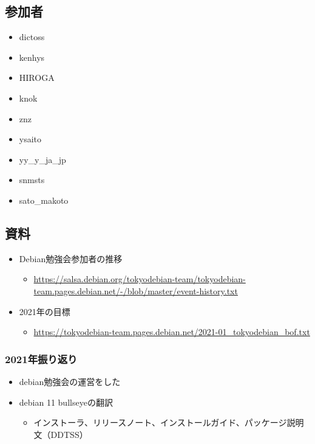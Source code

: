 \documentclass[mingoth,a4paper]{jsarticle}
\begin{document}

\subsection{参加者}

\begin{itemize}
  \item dictoss
  \item kenhys
  \item HIROGA
  \item knok
  \item znz
  \item ysaito
  \item yy\_y\_ja\_jp
  \item snmsts
  \item sato\_makoto
\end{itemize}

\subsection{資料}

\begin{itemize}
  \item Debian勉強会参加者の推移
    \begin{itemize}
    \item \url{https://salsa.debian.org/tokyodebian-team/tokyodebian-team.pages.debian.net/-/blob/master/event-history.txt}
    \end{itemize}
  \item 2021年の目標
    \begin{itemize}
    \item \url{https://tokyodebian-team.pages.debian.net/2021-01_tokyodebian_bof.txt}
    \end{itemize}
\end{itemize}

\subsubsection{2021年振り返り}


\begin{itemize}
  \item debian勉強会の運営をした
  \item debian 11 bullseyeの翻訳
  \begin{itemize}
    \item インストーラ、リリースノート、インストールガイド、パッケージ説明文（DDTSS）
  \end{itemize}
\end{itemize}
\end{document}
